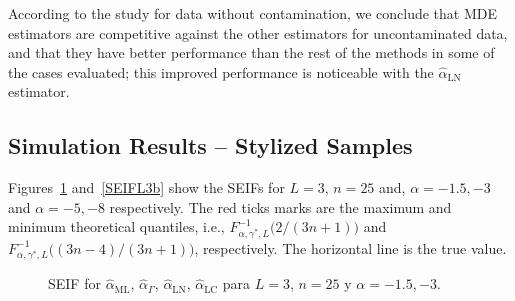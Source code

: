 \documentclass[twocolumn]{svjour3}
\begin{document}

According to the study for data without contamination, we conclude that MDE estimators are competitive against the other estimators for uncontaminated data, and that they have better performance than the rest of the methods in some of the cases evaluated; this improved performance is noticeable with the $\widehat{\alpha}_{\text{{LN}}}$ estimator.

\subsection{Simulation Results -- Stylized Samples}
\label{StylizedSamples}

Figures~\ref{SEIFL3a} and~\ref{SEIFL3b} show the SEIFs for $L=3$, $n=25$ and, $\alpha=-1.5,-3$ and $\alpha=-5,-8$ respectively. 
The red ticks marks are the maximum and minimum theoretical quantiles, i.e., $F^{-1}_{\alpha,\gamma^*,L}\big(2/(3n+1)\big)$ and $F^{-1}_{\alpha,\gamma^*,L}\big((3n-4)/(3n+1)\big)$, respectively.
The horizontal line is the true value.

\begin{figure}[hbt]
	\centering
	\caption{SEIF for $\widehat{\alpha}_{\text{{ML}}}$, $\widehat{\alpha}_{\Gamma}$, $\widehat{\alpha}_{\text{{LN}}}$, $\widehat{\alpha}_{\text{{{LC}}}}$ para $L=3$, $n=25$ y $\alpha=-1.5,-3$.}\label{SEIFL3a} 
\end{figure}
\end{document}
